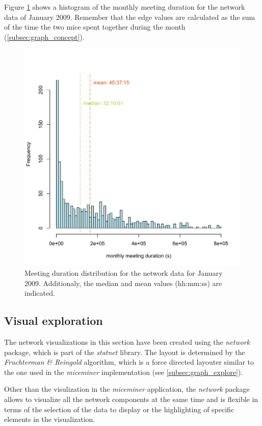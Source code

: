 Figure \ref{fig:meeting_frequency_januray} shows a histogram of the monthly meeting duration for the network data of January 2009. Remember that the edge values are calculated as the sum of the time the two mice spent together during the month (\ref{subsec:graph_concept}).

\begin{figure}[htpb]
\begin{center}
  \includegraphics[width=.75\textwidth]{assets/pdf/meeting_frequency_january.pdf}
  \caption[Histogram of monthly meeting duration]{Meeting duration distribution for the network data for January 2009. Additionaly, the median and mean values (hh:mm:ss) are indicated.}
  \label{fig:meeting_frequency_januray}
\end{center}
\end{figure}   

\subsection{Visual exploration}
\label{subsec:visual_exploration}

The network visualizations in this section have been created using the \textit{network}\cite{network:08} package, which is part of the \textit{statnet}\cite{statnet:03} library. The layout is determined by the \textit{Fruchterman \& Reingold}\cite{fruchterman:91} algorithm, which is a force directed layouter similar to the one used in the \textit{miceminer} implementation (see \ref{subsec:graph_explore}).

Other than the visulization in the \textit{miceminer} application, the \textit{network} package allows to visualize all the network components at the same time and is flexible in terms of the selection of the data to display or the highlighting of specific elements in the visualization.    

